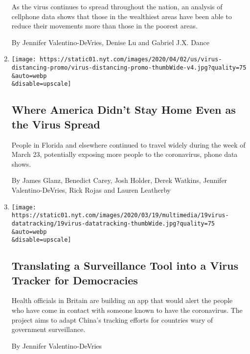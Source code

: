 \begin{enumerate}
  As the virus continues to spread throughout the nation, an analysis of
  cellphone data shows that those in the wealthiest areas have been able
  to reduce their movements more than those in the poorest areas.

  By Jennifer Valentino-DeVries, Denise Lu and Gabriel J.X. Dance
\item
  \href{/interactive/2020/04/02/us/coronavirus-social-distancing.html}{}

  \texttt{[image: https://static01.nyt.com/images/2020/04/02/us/virus-distancing-promo/virus-distancing-promo-thumbWide-v4.jpg?quality=75\\\&auto=webp\\\&disable=upscale]}

  \hypertarget{where-america-didnt-stay-home-even-as-the-virus-spread}{%
  \subsection{Where America Didn't Stay Home Even as the Virus
  Spread}\label{where-america-didnt-stay-home-even-as-the-virus-spread}}

  People in Florida and elsewhere continued to travel widely during the
  week of March 23, potentially exposing more people to the coronavirus,
  phone data shows.

  By James Glanz, Benedict Carey, Josh Holder, Derek Watkins, Jennifer
  Valentino-DeVries, Rick Rojas and Lauren Leatherby
\item
  \href{/2020/03/19/us/coronavirus-location-tracking.html}{}

  \texttt{[image: https://static01.nyt.com/images/2020/03/19/multimedia/19virus-datatracking/19virus-datatracking-thumbWide.jpg?quality=75\\\&auto=webp\\\&disable=upscale]}

  \hypertarget{translating-a-surveillance-tool-into-a-virus-tracker-for-democracies}{%
  \subsection{Translating a Surveillance Tool into a Virus Tracker for
  Democracies}\label{translating-a-surveillance-tool-into-a-virus-tracker-for-democracies}}

  Health officials in Britain are building an app that would alert the
  people who have come in contact with someone known to have the
  coronavirus. The project aims to adapt China's tracking efforts for
  countries wary of government surveillance.

  By Jennifer Valentino-DeVries


\end{enumerate}
